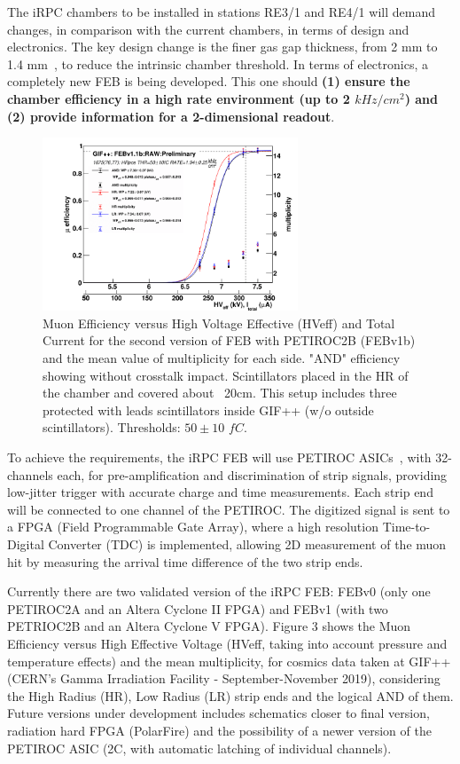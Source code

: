 The iRPC chambers to be installed in stations RE3/1 and RE4/1 will demand changes, in comparison with the current chambers, in terms of design and electronics. The key design change is the finer gas gap thickness, from 2 mm to 1.4 mm~\cite{muon_tdr}, to reduce the intrinsic chamber threshold. In terms of electronics, a completely new FEB is being developed. This one should \textbf{(1) ensure the chamber efficiency in a high rate environment (up to 2 $kHz/cm^2$) and (2) provide information for a 2-dimensional readout}. 

\begin{figure}
    \caption{\footnotesize Muon Efficiency versus High Voltage Effective (HVeff) and Total Current for the second version of FEB with PETIROC2B (FEBv1b) and the mean value of multiplicity for each side. "AND" efficiency showing without crosstalk impact. Scintillators placed in the HR of the chamber and covered about ~20cm. This setup includes three protected with leads scintillators inside GIF++ (w/o outside scintillators). Thresholds: $50\pm10$ $fC$.}\label{irpc_feb}

    \includegraphics[width=0.68\textwidth, trim = {2.5cm 0 0.5cm 0 }, clip]{uioposter-images/irpc_feb_eff_v2}
\end{figure}

To achieve the requirements, the iRPC FEB will use PETIROC ASICs~\cite{petiroc}, with 32-channels each, for pre-amplification and discrimination of strip signals, providing low-jitter trigger with accurate charge and time measurements. Each strip end will be connected to one channel of the PETIROC. The digitized signal is sent to a FPGA (Field Programmable Gate Array), where a high resolution Time-to-Digital Converter (TDC) is implemented, allowing 2D measurement of the muon hit by measuring the arrival time difference of the two strip ends.

Currently there are two validated version of the iRPC FEB: FEBv0 (only one PETIROC2A and an Altera Cyclone II FPGA) and FEBv1 (with two PETRIOC2B and an Altera Cyclone V FPGA). Figure 3 shows the Muon Efficiency versus High Effective Voltage (HVeff, taking into account pressure and temperature effects) and the mean multiplicity, for cosmics data taken at GIF++ (CERN's Gamma Irradiation Facility - September-November 2019), considering the High Radius (HR), Low Radius (LR) strip ends and the logical AND of them. Future versions under development includes schematics closer to final version, radiation hard FPGA (PolarFire) and the possibility of a newer version of the PETIROC ASIC (2C, with automatic latching of individual channels).  

